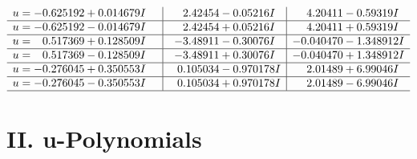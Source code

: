 \documentclass[1p]{elsarticle_modified}
\theoremstyle{definition}
\begin{document}
$$\begin{array}{c|c|c}
\begin{aligned}
u &= -0.625192 + 0.014679 I\end{aligned}
 & \phantom{-}2.42454 - 0.05216 I & \phantom{-}4.20411 - 0.59319 I \\ \hline\begin{aligned}
u &= -0.625192 - 0.014679 I\end{aligned}
 & \phantom{-}2.42454 + 0.05216 I & \phantom{-}4.20411 + 0.59319 I \\ \hline\begin{aligned}
u &= \phantom{-}0.517369 + 0.128509 I\end{aligned}
 & -3.48911 - 0.30076 I & -0.040470 - 1.348912 I \\ \hline\begin{aligned}
u &= \phantom{-}0.517369 - 0.128509 I\end{aligned}
 & -3.48911 + 0.30076 I & -0.040470 + 1.348912 I \\ \hline\begin{aligned}
u &= -0.276045 + 0.350553 I\end{aligned}
 & \phantom{-}0.105034 - 0.970178 I & \phantom{-}2.01489 + 6.99046 I \\ \hline\begin{aligned}
u &= -0.276045 - 0.350553 I\end{aligned}
 & \phantom{-}0.105034 + 0.970178 I & \phantom{-}2.01489 - 6.99046 I\\
 \hline 
 \end{array}$$\newpage
\newpage\renewcommand{\arraystretch}{1}
\centering \section*{ II. u-Polynomials}
\end{document}
